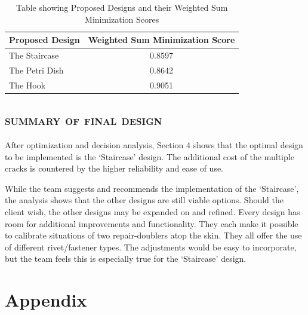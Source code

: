 \documentclass[12pt]{article}
\begin{document}
\begin{table}[h!]   
\begin{center}
    \begin{tabular}{ | l | c |}
    \hline
    Proposed Design & Weighted Sum Minimization Score  \\ \hline
    The Staircase & 0.8597    \\ \hline
    The Petri Dish & 0.8642    \\ \hline
    The Hook & 0.9051    \\ \hline
	\end{tabular}
\caption{Table showing Proposed Designs and their Weighted Sum Minimization Scores}
\label{results}    
\end{center}
\end{table}


\subsection{\textsc{summary of final design}}
After optimization and decision analysis, Section 4 shows that the optimal design to be implemented is the `Staircase' design. The additional cost of the multiple cracks is countered by the higher reliability and ease of use.

While the team suggests and recommends the implementation of the `Staircase', the analysis shows that the other designs are still viable options. Should the client wish, the other designs may be expanded on and refined. Every design has room for additional improvements and functionality. They each make it possible to calibrate situations of two repair-doublers atop the skin. They all offer the use of different rivet/fastener types. The adjustments would be easy to incorporate, but the team feels this is especially true for the `Staircase' design.

\newpage
\section{Appendix}
\end{document}
